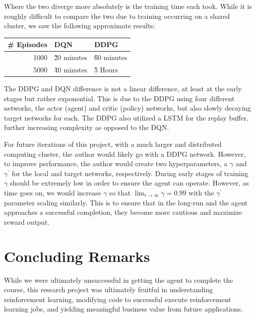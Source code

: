 \documentclass[doc, onecolumn, 12pt]{apa6}
\begin{document}
Where the two diverge more absolutely is the training time each took. While it is roughly difficult to compare the two due to training occurring on a shared cluster, we saw the following approximate results:

\begin{tabular}{r||ll}
\hline 
\# Episodes & DQN & DDPG \\ 
\hline 
1000 &  \~ 20 minutes &  \~ 60 minutes \\ 
5000 & \~ 40 minutes & \~ 5 Hours \\ 
\hline
\end{tabular} 


The DDPG and DQN difference is not a linear difference, at least at the early stages but rather exponential. This is due to the DDPG using four different networks, the actor (agent) and critic (policy) networks, but also slowly decaying target networks for each. The DDPG also utilized a LSTM for the replay buffer, further increasing complexity as opposed to the DQN. 

For future iterations of this project, with a much larger and distributed computing cluster, the author would likely go with a DDPG network. However, to improve performance, the author would create two hyperparameters, a $\gamma$ and $\gamma^{\prime}$ for the local and target networks, respectively. During early stages of training $\gamma$ should be extremely low in order to  ensure the agent can operate. However, as time goes on, we would increase $\gamma$ so that $\lim_{t \to \infty} \gamma = 0.99$ with the $\gamma^{\prime}$ parameter scaling similarly. This is to ensure that in the long-run and the agent approaches a successful completion, they become more cautious and maximize reward output. 




\newpage 
\section{Concluding Remarks}

While we were ultimately unsuccessful  in getting the agent to complete the course, this research project was ultimately fruitful in understanding reinforcement learning, modifying code to successful execute reinforcement learning jobs, and yielding meaningful business value from future applications. 
\end{document}
